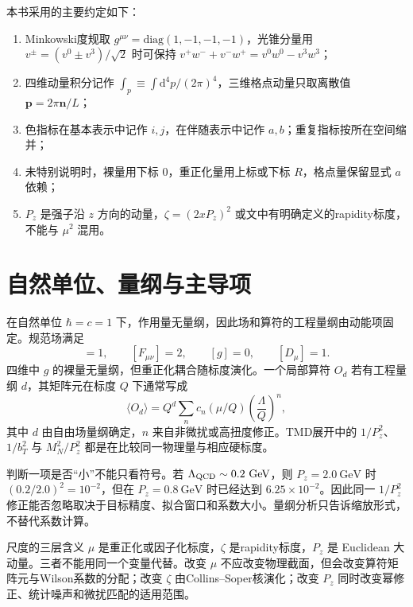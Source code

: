 \documentclass[UTF8,12pt,a4paper,twoside,openany]{ctexbook}
\newcommand{\dd}{\mathrm{d}}
\begin{document}
本书采用的主要约定如下：
\begin{enumerate}
  \item Minkowski度规取 \(g^{\mu\nu}=\mathrm{diag}(1,-1,-1,-1)\)，光锥分量用 \(v^\pm=(v^0\pm v^3)/\sqrt2\) 时可保持 \(v^+w^-+v^-w^+=v^0w^0-v^3w^3\)；
  \item 四维动量积分记作 \(\int_p\equiv\int\dd^4p/(2\pi)^4\)，三维格点动量只取离散值 \(\mathbf p=2\pi\mathbf n/L\)；
  \item 色指标在基本表示中记作 \(i,j\)，在伴随表示中记作 \(a,b\)；重复指标按所在空间缩并；
  \item 未特别说明时，裸量用下标 \(0\)，重正化量用上标或下标 \(R\)，格点量保留显式 \(a\) 依赖；
  \item \(P_z\) 是强子沿 \(z\) 方向的动量，\(\zeta=(2xP_z)^2\) 或文中有明确定义的rapidity标度，不能与 \(\mu^2\) 混用。
\end{enumerate}

\section{自然单位、量纲与主导项}

在自然单位 \(\hbar=c=1\) 下，作用量无量纲，因此场和算符的工程量纲由动能项固定。规范场满足
\begin{equation}
  [A_\mu]=1,
  \qquad
  [F_{\mu\nu}]=2,
  \qquad
  [g]=0,
  \qquad
  [D_\mu]=1.
  \label{eq:toolbox-engineeringdim}
\end{equation}
四维中 \(g\) 的裸量无量纲，但重正化耦合随标度演化。一个局部算符 \(O_d\) 若有工程量纲 \(d\)，其矩阵元在标度 \(Q\) 下通常写成
\begin{equation}
  \langle O_d\rangle
  =Q^{d}\sum_{n}c_n(\mu/Q)\left(\frac{\Lambda}{Q}\right)^n,
  \label{eq:toolbox-powercounting}
\end{equation}
其中 \(d\) 由自由场量纲确定，\(n\) 来自非微扰或高扭度修正。TMD展开中的 \(1/P_z^2\)、\(1/b_T^2\) 与 \(M_N^2/P_z^2\) 都是在比较同一物理量与相应硬标度。

判断一项是否“小”不能只看符号。若 \(\Lambda_{\rm QCD}\sim0.2~\mathrm{GeV}\)，则 \(P_z=2.0~\mathrm{GeV}\) 时 \((0.2/2.0)^2=10^{-2}\)，但在 \(P_z=0.8~\mathrm{GeV}\) 时已经达到 \(6.25\times10^{-2}\)。因此同一 \(1/P_z^2\) 修正能否忽略取决于目标精度、拟合窗口和系数大小。量纲分析只告诉缩放形式，不替代系数计算。

\begin{physicalbox}{尺度的三层含义}
\(\mu\) 是重正化或因子化标度，\(\zeta\) 是rapidity标度，\(P_z\) 是 Euclidean 大动量。三者不能用同一个变量代替。改变 \(\mu\) 不应改变物理截面，但会改变算符矩阵元与Wilson系数的分配；改变 \(\zeta\) 由Collins--Soper核演化；改变 \(P_z\) 同时改变幂修正、统计噪声和微扰匹配的适用范围。
\end{physicalbox}
\end{document}
